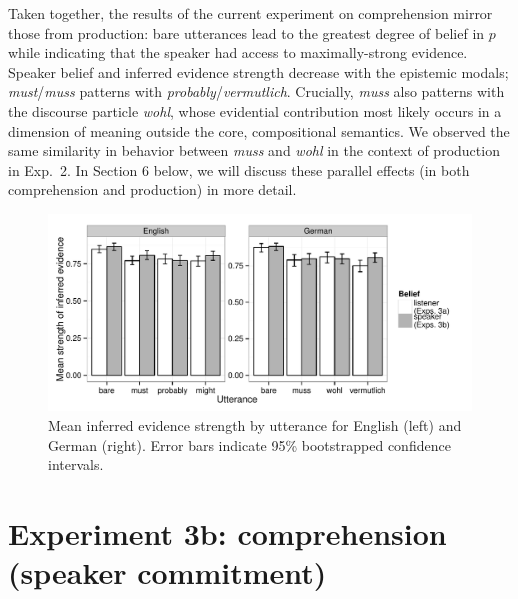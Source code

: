 \documentclass[11pt]{article}
\begin{document}
Taken together, the results of the current experiment on comprehension mirror those from production: bare utterances lead to the greatest degree of belief in $p$ while indicating that the speaker had access to maximally-strong evidence. Speaker belief and inferred evidence strength decrease with the epistemic modals; \emph{must}/\emph{muss} patterns with \emph{probably}/\emph{vermutlich}. Crucially, \emph{muss} also patterns with the discourse particle \emph{wohl}, whose evidential contribution most likely occurs in a dimension of meaning outside the core, compositional semantics. We observed the same similarity in behavior between \emph{muss} and \emph{wohl} in the context of production in Exp.~2. In Section 6 below, we will discuss these parallel effects (in both comprehension and production) in more detail.



\begin{figure}
	\centering
	\includegraphics[width=\textwidth]{pics/mean-evidence}
	\caption{Mean inferred evidence strength by utterance for English (left) and German (right). Error bars indicate 95\% bootstrapped confidence intervals.}
	\label{fig:exp3-evidence}
\end{figure}

\section{Experiment 3b: comprehension (speaker commitment)}
\end{document}
